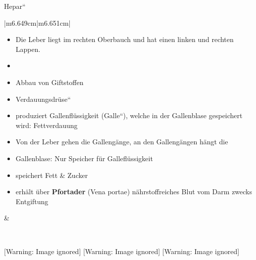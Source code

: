 \documentclass{article}
\newcommand\gT[1]{\textbf{\textup{\textcolor[rgb]{0.0,0.5019608,0.0}{#1}}}}
\newcommand\gZ[1]{\textcolor[rgb]{0.5019608,0.5019608,0.5019608}{#1}}
\begin{document}
{\mdseries
\gZ{{\quotedblbase}Hepar{\textquotedblleft}}}

\begin{center}
\tablehead{}\begin{supertabular}{|m{6.649cm}|m{6.651cm}|}
\hline
\begin{itemize}
\item Die Leber liegt im rechten Oberbauch und hat einen linken und
rechten Lappen. 

\item \item Abbau von Giftstoffen

\item {\quotedblbase}Verdauungsdr\"use{\textquotedblleft}

\end{itemize}
\begin{itemize}
\item produziert Gallenfl\"ussigkeit
({\quotedblbase}Galle{\textquotedblleft}), welche in der Gallenblase
gespeichert wird: Fettverdauung

\item Von der Leber gehen die Galleng\"ange, an den Galleng\"angen
h\"angt die 

\end{itemize}
\begin{itemize}
\item {}Gallenblase: Nur Speicher f\"ur
Gallefl\"ussigkeit

\end{itemize}
\begin{itemize}
\item speichert Fett \& Zucker

\item erh\"alt \"uber \gT{Pfortader}
(Vena portae) n\"ahrstoffreiches Blut vom Darm zwecks Entgiftung

\end{itemize}
 &
{%
 \par}

\\\hline
\end{supertabular}
\end{center}
  [Warning: Image ignored] %
   [Warning: Image ignored] %
   [Warning: Image ignored] %
 
\end{document}
